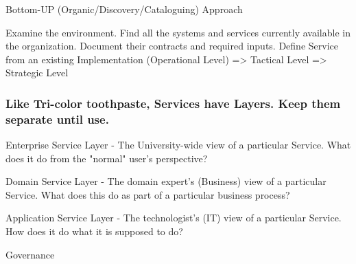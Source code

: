 \documentclass{article}
\begin{document}
Bottom-UP (Organic/Discovery/Cataloguing) Approach

Examine the environment.  Find all the systems and services currently available in the organization.  Document their contracts and required inputs.
Define Service from an existing Implementation (Operational Level) => Tactical Level => Strategic Level

\subsubsection{Like Tri-color toothpaste, Services have Layers.  Keep them separate until use.}
Enterprise Service Layer - The University-wide view of a particular Service.  What does it do from the "normal" user's perspective?

Domain Service Layer - The domain expert's (Business) view of a particular Service.  What does this do as part of a particular business process?

Application Service Layer - The technologist's (IT) view of a particular Service.  How does it do what it is supposed to do?

Governance
\end{document}
